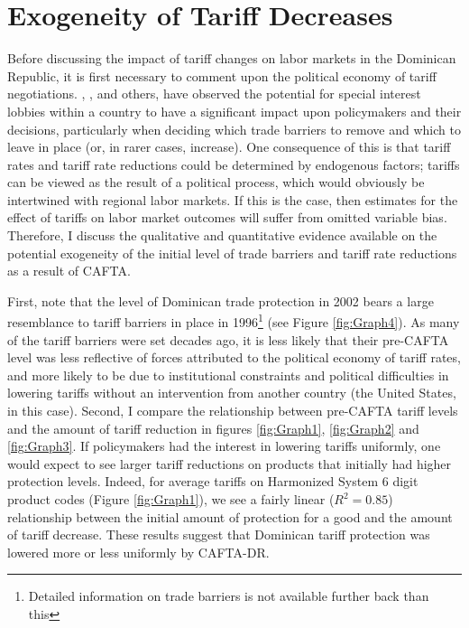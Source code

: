 \documentclass[12pt]{article}
\begin{document}
\vspace{-10pt}
\section{Exogeneity of Tariff Decreases}
\label{sec:Exogeneity}
Before discussing the impact of tariff changes on labor markets in
the Dominican Republic, it is first necessary to comment upon the political economy of
tariff negotiations. \citet{grossman}, \citet{brock1978}, \citet{maggi2007political} and others, have observed the potential
for special interest lobbies within a country to have a significant impact upon policymakers
and their decisions, particularly when deciding which trade barriers to remove and which
to leave in place (or, in rarer cases, increase). One consequence of this is that tariff rates
and tariff rate reductions could be determined by endogenous factors; tariffs can be viewed as the
result of a political process, which would  obviously be intertwined with regional
labor markets. If this is the case, then estimates for the effect of tariffs on labor market
outcomes will suffer from omitted variable bias. Therefore, I discuss the qualitative and
quantitative evidence available on the potential exogeneity of the initial level of
trade barriers and tariff rate reductions as a result
of CAFTA. 

First, note that the level of Dominican trade protection in 2002 bears a large resemblance
to tariff barriers in place in 1996\footnote{Detailed
information on trade barriers is not available further back than this} (see Figure \ref{fig:Graph4}).
As many of the tariff barriers were set decades ago, it is less likely that their pre-CAFTA level 
was less reflective of forces attributed to the political economy of tariff rates, and 
more likely to be due to institutional constraints and
political difficulties in lowering tariffs without an intervention from another country (the
United States, in this case). 
Second, I compare the relationship between pre-CAFTA tariff
levels and the amount of tariff reduction in figures \ref{fig:Graph1}, \ref{fig:Graph2} and 
\ref{fig:Graph3}. If policymakers had the interest
in lowering tariffs uniformly, one would expect to see larger tariff reductions on products that
initially had higher protection levels. Indeed, for average tariffs on Harmonized System 
6 digit product codes (Figure \ref{fig:Graph1}), we see a fairly linear ($R^2=0.85$) relationship 
between the initial amount of protection for a good and
the amount of tariff decrease. These results suggest that Dominican tariff protection
was lowered more or less uniformly by CAFTA-DR.
\end{document}
